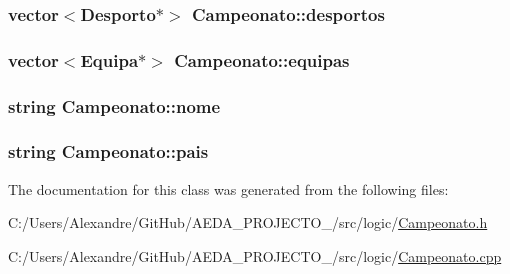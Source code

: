 \subsubsection[{desportos}]{\setlength{\rightskip}{0pt plus 5cm}vector$<${\bf Desporto}$\ast$$>$ Campeonato\+::desportos\hspace{0.3cm}{\ttfamily [private]}}\label{class_campeonato_ab65bbad67e796b73176b696457ea39ea}
\hypertarget{class_campeonato_ab677d5217856ce0ff2887a0e335caf2d}{}
\subsubsection[{equipas}]{\setlength{\rightskip}{0pt plus 5cm}vector$<${\bf Equipa}$\ast$$>$ Campeonato\+::equipas\hspace{0.3cm}{\ttfamily [private]}}\label{class_campeonato_ab677d5217856ce0ff2887a0e335caf2d}
\hypertarget{class_campeonato_a670b0857b7a8bc3c5dbf0f927ee192fe}{}
\subsubsection[{nome}]{\setlength{\rightskip}{0pt plus 5cm}string Campeonato\+::nome\hspace{0.3cm}{\ttfamily [private]}}\label{class_campeonato_a670b0857b7a8bc3c5dbf0f927ee192fe}
\hypertarget{class_campeonato_a9f7011b322e9ae5fe6504ca5946268bf}{}
\subsubsection[{pais}]{\setlength{\rightskip}{0pt plus 5cm}string Campeonato\+::pais\hspace{0.3cm}{\ttfamily [private]}}\label{class_campeonato_a9f7011b322e9ae5fe6504ca5946268bf}


The documentation for this class was generated from the following files\+:\begin{DoxyCompactItemize}
\item 
C\+:/\+Users/\+Alexandre/\+Git\+Hub/\+A\+E\+D\+A\+\_\+\+P\+R\+O\+J\+E\+C\+T\+O\+\_/src/logic/\hyperlink{_campeonato_8h}{Campeonato.\+h}\item 
C\+:/\+Users/\+Alexandre/\+Git\+Hub/\+A\+E\+D\+A\+\_\+\+P\+R\+O\+J\+E\+C\+T\+O\+\_/src/logic/\hyperlink{_campeonato_8cpp}{Campeonato.\+cpp}\end{DoxyCompactItemize}
